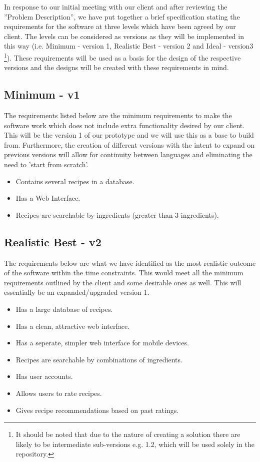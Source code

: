 In response to our initial meeting with our client and after reviewing the ''Problem Description'', we have put together a brief specification stating the requirements for the software at three levels which have been agreed by our client. The levels can be considered as versions as they will be implemented in this way (i.e. Minimum - version 1, Realistic Best -  version 2 and Ideal - version3 \footnote{It should be noted that due to the nature of creating a solution there are likely to be intermediate sub-versions e.g. 1.2, which will be used solely in the repository.}). These requirements will be used as a basis for the design of the respective versions and the designs will be created with these requirements in mind.

\subsection{Minimum - v1}

The requirements listed below are the minimum requirements to make the software work which does not include extra functionality desired by our client. This will be the version 1 of our prototype and we will use this as a base to build from. 
Furthermore, the creation of different versions with the intent to expand on previous versions will allow for continuity between languages and eliminating the need to 'start from scratch'.

\begin{itemize}
	\item Contains several recipes in a database.
	\item Has a Web Interface.
	\item Recipes are searchable by ingredients (greater than 3 ingredients).

\end{itemize}

\subsection{Realistic Best - v2}

The requirements below are what we have identified as the most realistic outcome of the software within the time constraints. This would meet all the minimum requirements outlined by the client and some desirable ones as well. This will essentially be an expanded/upgraded version 1.

\begin{itemize}
	\item Has a large database of recipes.
	\item Has a clean, attractive web interface.
	\item Has a seperate, simpler web interface for mobile devices.
	\item Recipes are searchable by combinations of ingredients.
	\item Has user accounts.
	\item Allows users to rate recipes.
	\item Gives recipe recommendations based on past ratings.
\end{itemize}

